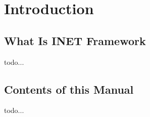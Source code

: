 \chapter{Introduction}
\label{cha:introduction}


\section{What Is INET Framework}

todo...

\section{Contents of this Manual}

todo...



